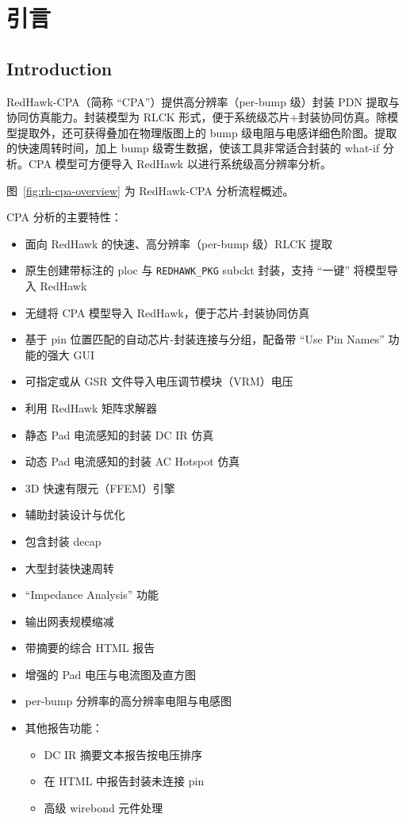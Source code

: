 ﻿%
\label{chap:cpa}

\section{引言}
\subsection*{Introduction}

RedHawk-CPA（简称 ``CPA''）提供高分辨率（per-bump 级）封装 PDN 提取与协同仿真能力。封装模型为 RLCK 形式，便于系统级芯片+封装协同仿真。除模型提取外，还可获得叠加在物理版图上的 bump 级电阻与电感详细色阶图。提取的快速周转时间，加上 bump 级寄生数据，使该工具非常适合封装的 what-if 分析。CPA 模型可方便导入 RedHawk 以进行系统级高分辨率分析。

图~\ref{fig:rh-cpa-overview} 为 RedHawk-CPA 分析流程概述。

\label{fig:rh-cpa-overview}

CPA 分析的主要特性：
\begin{itemize}
  \item 面向 RedHawk 的快速、高分辨率（per-bump 级）RLCK 提取
  \item 原生创建带标注的 ploc 与 \texttt{REDHAWK\_PKG} subckt 封装，支持 ``一键'' 将模型导入 RedHawk
  \item 无缝将 CPA 模型导入 RedHawk，便于芯片-封装协同仿真
  \item 基于 pin 位置匹配的自动芯片-封装连接与分组，配备带 ``Use Pin Names'' 功能的强大 GUI
  \item 可指定或从 GSR 文件导入电压调节模块（VRM）电压
  \item 利用 RedHawk 矩阵求解器
  \item 静态 Pad 电流感知的封装 DC IR 仿真
  \item 动态 Pad 电流感知的封装 AC Hotspot 仿真
  \item 3D 快速有限元（FFEM）引擎
  \item 辅助封装设计与优化
  \item 包含封装 decap
  \item 大型封装快速周转
  \item ``Impedance Analysis'' 功能
  \item 输出网表规模缩减
  \item 带摘要的综合 HTML 报告
  \item 增强的 Pad 电压与电流图及直方图
  \item per-bump 分辨率的高分辨率电阻与电感图
  \item 其他报告功能：
  \begin{itemize}
    \item DC IR 摘要文本报告按电压排序
    \item 在 HTML 中报告封装未连接 pin
    \item 高级 wirebond 元件处理
  \end{itemize}
\end{itemize}

